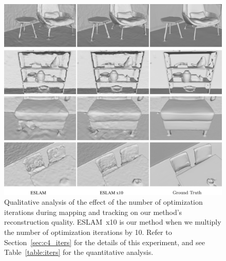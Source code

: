 \begin{figure}[t]
    \begin{center}
        \includegraphics[width=1.0\linewidth]{images/chapter4/figures/iters.jpg}
    \end{center}
    \caption{Qualitative analysis of the effect of the number of optimization iterations during mapping and tracking on our method's reconstruction quality. ESLAM~x10 is our method when we multiply the number of optimization iterations by 10. Refer to Section~\ref{sec:c4_iters} for the details of this experiment, and see Table~\ref{table:iters} for the quantitative analysis.}
    \label{fig:c4_iters}
\end{figure}

